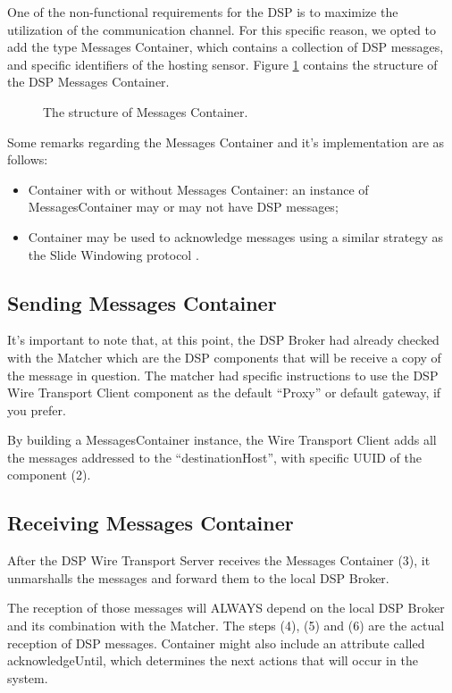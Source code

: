 \documentclass[conference]{IEEEtran}
\begin{document}
One of the non-functional requirements for the DSP is to maximize the
utilization of the communication channel. For this specific reason, we
opted to add the type Messages Container, which contains a collection
of DSP messages, and specific identifiers of the hosting sensor.
Figure \ref{FIG_DSP_MSGS_CONTAINER} contains the structure of the DSP
Messages Container.

\begin{figure}[!htb]
\centering
{}
\caption{\label{FIG_DSP_MSGS_CONTAINER} The structure of Messages Container.}
\end{figure}

Some remarks regarding the Messages Container and it's implementation are as
follows:

\begin{itemize}
  \item Container with or without Messages Container: an instance of
  MessagesContainer may or may not have DSP messages;
  \item Container may be used to acknowledge messages using a similar strategy
  as the Slide Windowing protocol \cite{slide-window}. 
\end{itemize}

\subsection{Sending Messages Container}

It's important to note that, at this point, the DSP Broker had already
checked with the Matcher which are the DSP components that will be
receive a copy of the message in question. The matcher had specific
instructions to use the DSP Wire Transport Client component as the
default ``Proxy'' or default gateway, if you prefer.

By building a MessagesContainer instance, the Wire Transport Client
adds all the messages addressed to the ``destinationHost'', with
specific UUID of the component (2).

\subsection{Receiving Messages Container}

After the DSP Wire Transport Server receives the Messages Container
(3), it unmarshalls the messages and forward them to the local DSP
Broker.

The reception of those messages will ALWAYS depend on the local DSP Broker and
its combination with the Matcher. The steps (4), (5) and (6) are the
actual reception of DSP messages. Container might also include an attribute
called acknowledgeUntil, which determines the next actions that will occur in the system.
\end{document}
